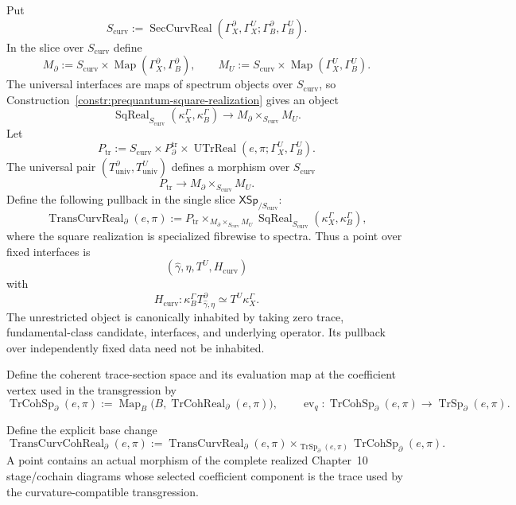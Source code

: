 \begin{definition}
\label{def:prequantum-curvature-compatible-transgression-realization}
Put
\[
S_{\mathrm{curv}}
:=
\operatorname{SecCurvReal}
(\Gamma_X^{\partial},\Gamma_X^U;
 \Gamma_B^{\partial},\Gamma_B^U).
\]
In the slice over $S_{\mathrm{curv}}$ define
\[
M_{\partial}
:=
S_{\mathrm{curv}}
\times\operatorname{Map}
(\Gamma_X^{\partial},\Gamma_B^{\partial}),
\qquad
M_U
:=
S_{\mathrm{curv}}
\times\operatorname{Map}(\Gamma_X^U,\Gamma_B^U).
\]
The universal interfaces are maps of spectrum objects over
$S_{\mathrm{curv}}$, so
Construction~\ref{constr:prequantum-square-realization} gives an object
\[
\operatorname{SqReal}_{S_{\mathrm{curv}}}
(\kappa_X^\Gamma,\kappa_B^\Gamma)
\longrightarrow M_{\partial}\times_{S_{\mathrm{curv}}}M_U.
\]
Let
\[
P_{\mathrm{tr}}
:=
S_{\mathrm{curv}}
\times P_{\partial}^{\mathrm{tr}}
\times
\operatorname{UTrReal}(e,\pi;\Gamma_X^U,\Gamma_B^U).
\]
The universal pair $(T^{\partial}_{\mathrm{univ}},T^U_{\mathrm{univ}})$
defines a morphism over $S_{\mathrm{curv}}$
\[
P_{\mathrm{tr}}
\longrightarrow M_{\partial}\times_{S_{\mathrm{curv}}}M_U.
\]
Define the following pullback in the single slice
$\mathsf{XSp}_{/S_{\mathrm{curv}}}$:
\[
\boxed{
\operatorname{TransCurvReal}_{\partial}(e,\pi)
:=
P_{\mathrm{tr}}
\times_{M_{\partial}\times_{S_{\mathrm{curv}}}M_U}
\operatorname{SqReal}_{S_{\mathrm{curv}}}
(\kappa_X^{\Gamma},\kappa_B^{\Gamma}),
}
\]
where the square realization is specialized fibrewise to spectra.  Thus a point
over fixed interfaces is
\[
(\widehat\gamma,\eta,T^U,H_{\mathrm{curv}})
\]
with
\[
\boxed{
H_{\mathrm{curv}}:
\kappa_B^{\Gamma}T^{\partial}_{\widehat\gamma,\eta}
\simeq
T^U\kappa_X^{\Gamma}.
}
\]
The unrestricted object is canonically inhabited by taking zero trace,
fundamental-class candidate, interfaces, and underlying operator.  Its pullback
over independently fixed data need not be inhabited.
\end{definition}

Define the coherent trace-section space and its evaluation map at the coefficient
vertex used in the transgression by
\[
\operatorname{TrCohSp}_{\partial}(e,\pi)
:=
\operatorname{Map}_B
\bigl(B,\operatorname{TrCohReal}_{\partial}(e,\pi)\bigr),
\qquad
\operatorname{ev}_q:
\operatorname{TrCohSp}_{\partial}(e,\pi)
\longrightarrow\operatorname{TrSp}_{\partial}(e,\pi).
\]

\begin{definition}
\label{def:prequantum-coherent-stage-curvature-transgression}
Define the explicit base change
\[
\boxed{
\operatorname{TransCurvCohReal}_{\partial}(e,\pi)
:=
\operatorname{TransCurvReal}_{\partial}(e,\pi)
\times_{\operatorname{TrSp}_{\partial}(e,\pi)}
\operatorname{TrCohSp}_{\partial}(e,\pi).
}
\]
A point contains an actual morphism of the complete realized Chapter~10
stage/cochain diagrams whose selected coefficient component is the trace used by
the curvature-compatible transgression.
\end{definition}

